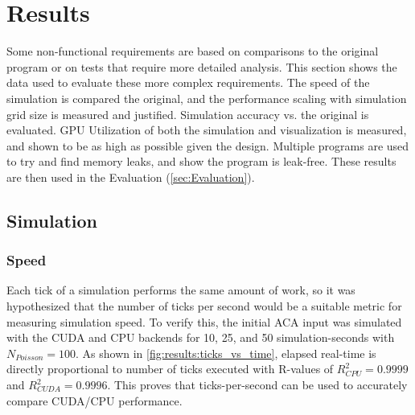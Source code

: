 
\newcommand{\npoisson}{N_{Poisson}}

\chapter{Results}\label{sec:Results}
Some non-functional requirements are based on comparisons to the original program or on tests that require more detailed analysis.
This section shows the data used to evaluate these more complex requirements.
The speed of the simulation is compared the original, and the performance scaling with simulation grid size is measured and justified.
Simulation accuracy vs. the original is evaluated.
GPU Utilization of both the simulation and visualization is measured, and shown to be as high as possible given the design.
Multiple programs are used to try and find memory leaks, and show the program is leak-free.
These results are then used in the Evaluation (\cref{sec:Evaluation}).

\pagebreak
\section{Simulation}

\subsection{Speed}\label{sec:Results:Sim:Speed}



Each tick of a simulation performs the same amount of work, so it was hypothesized that the number of ticks per second would be a suitable metric for measuring simulation speed.
To verify this, the initial ACA input was simulated with the CUDA and CPU backends for 10, 25, and 50 simulation-seconds with $\npoisson = 100$.
As shown in \cref{fig:results:ticks_vs_time}, elapsed real-time is directly proportional to number of ticks executed with R-values of $R^2_{CPU} = 0.9999$ and $R^2_{CUDA} = 0.9996$.
This proves that ticks-per-second can be used to accurately compare CUDA/CPU performance.




